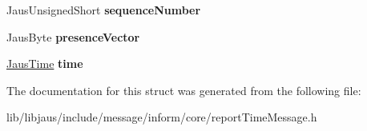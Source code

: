 \begin{DoxyCompactItemize}
\item 
\hypertarget{struct_report_time_message_struct_ae98da32c3519d80687eae13af351cd8d}{\-Jaus\-Unsigned\-Short {\bfseries sequence\-Number}}\label{struct_report_time_message_struct_ae98da32c3519d80687eae13af351cd8d}

\item 
\hypertarget{struct_report_time_message_struct_a9809bee690e65bc6389197352281d610}{\-Jaus\-Byte {\bfseries presence\-Vector}}\label{struct_report_time_message_struct_a9809bee690e65bc6389197352281d610}

\item 
\hypertarget{struct_report_time_message_struct_aece2bf379e10299c8fe63bd035a69561}{\hyperlink{struct_jaus_time_struct}{\-Jaus\-Time} {\bfseries time}}\label{struct_report_time_message_struct_aece2bf379e10299c8fe63bd035a69561}

\end{DoxyCompactItemize}


\-The documentation for this struct was generated from the following file\-:\begin{DoxyCompactItemize}
\item 
lib/libjaus/include/message/inform/core/report\-Time\-Message.\-h\end{DoxyCompactItemize}
